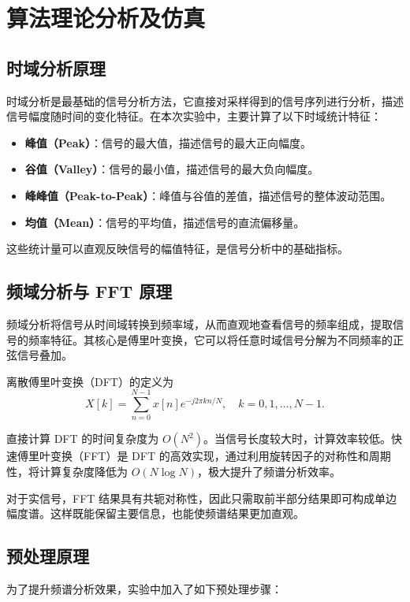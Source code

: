 \documentclass[11pt,a4paper]{ctexart}
\begin{document}
\section{算法理论分析及仿真}

\subsection{时域分析原理}

时域分析是最基础的信号分析方法，它直接对采样得到的信号序列进行分析，描述信号幅度随时间的变化特征。在本次实验中，主要计算了以下时域统计特征：

\begin{itemize}
  \item \textbf{峰值（Peak）}：信号的最大值，描述信号的最大正向幅度。
  \item \textbf{谷值（Valley）}：信号的最小值，描述信号的最大负向幅度。
  \item \textbf{峰峰值（Peak-to-Peak）}：峰值与谷值的差值，描述信号的整体波动范围。
  \item \textbf{均值（Mean）}：信号的平均值，描述信号的直流偏移量。
\end{itemize}

这些统计量可以直观反映信号的幅值特征，是信号分析中的基础指标。

\subsection{频域分析与 FFT 原理}

频域分析将信号从时间域转换到频率域，从而直观地查看信号的频率组成，提取信号的频率特征。其核心是傅里叶变换，它可以将任意时域信号分解为不同频率的正弦信号叠加。

离散傅里叶变换（DFT）的定义为
\[
X[k] = \sum_{n=0}^{N-1} x[n] e^{-j 2\pi kn/N}, \quad k = 0, 1, \ldots, N-1.
\]

直接计算 DFT 的时间复杂度为 $O(N^2)$。当信号长度较大时，计算效率较低。快速傅里叶变换（FFT）是 DFT 的高效实现，通过利用旋转因子的对称性和周期性，将计算复杂度降低为 $O(N\log N)$，极大提升了频谱分析效率。

对于实信号，FFT 结果具有共轭对称性，因此只需取前半部分结果即可构成单边幅度谱。这样既能保留主要信息，也能使频谱结果更加直观。

\subsection{预处理原理}

为了提升频谱分析效果，实验中加入了如下预处理步骤：
\end{document}
